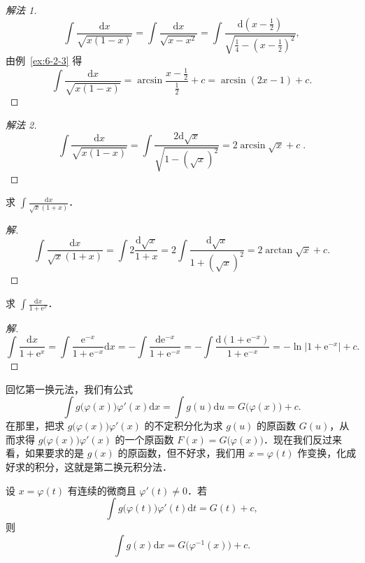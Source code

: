 \begin{proof}[解法 1]
\[
\int\frac{\mathrm{d}x}{\sqrt{x(1-x)}}
= \int\frac{\mathrm{d}x}{\sqrt{x-x^{2}}}
= \int\frac{\mathrm{d}\left(x-\frac{1}{2}\right)}{\sqrt{\frac{1}{4}-\left(x-\frac{1}{2}\right)^{2}}},
\]
由例~\ref{ex:6-2-3} 得
\[
\int\frac{\mathrm{d}x}{\sqrt{x(1-x)}}
= \arcsin\frac{x-\frac{1}{2}}{\frac{1}{2}}+c
= \arcsin(2x-1)+c.
\]
\end{proof}

\begin{proof}[解法 2]
\[
\int\frac{\mathrm{d}x}{\sqrt{x(1-x)}}
= \int\frac{2\mathrm{d}\sqrt{x}}{\sqrt{1-(\sqrt{x})^{2}}}
= 2\arcsin\sqrt{x}+c\;.
\]
\end{proof}

\begin{example}\label{ex:6-2-6}
求 $\displaystyle\int\frac{\mathrm{d}x}{\sqrt{x}(1+x)}$．
\end{example}

\begin{proof}[解]
\[
\int\frac{\mathrm{d}x}{\sqrt{x}(1+x)}
= \int 2\frac{\mathrm{d}\sqrt{x}}{1+x}
= 2\int\frac{\mathrm{d}\sqrt{x}}{1+(\sqrt{x})^{2}}
= 2\arctan\sqrt{x}+c.
\]
\end{proof}

\begin{example}\label{ex:6-2-7}
求 $\displaystyle\int\frac{\mathrm{d}x}{1+\mathrm{e}^{x}}$．
\end{example}

\begin{proof}[解]
\[
\int\frac{\mathrm{d}x}{1+\mathrm{e}^{x}}
= \int\frac{\mathrm{e}^{-x}}{1+\mathrm{e}^{-x}}\mathrm{d}x
= -\int\frac{\mathrm{d}\mathrm{e}^{-x}}{1+\mathrm{e}^{-x}}
= -\int\frac{\mathrm{d}(1+\mathrm{e}^{-x})}{1+\mathrm{e}^{-x}}
= -\ln\left|1+\mathrm{e}^{-x}\right|+c.
\]
\end{proof}

回忆第一换元法，我们有公式
\[
\int g\big(\varphi(x)\big)\varphi'(x)\mathrm{d}x = \int g(u)\mathrm{d}u = G\big(\varphi(x)\big)+c.
\]
在那里，把求 $g\big(\varphi(x)\big)\varphi'(x)$ 的不定积分化为求 $g(u)$ 的原函数 $G(u)$，从而求得 $g\big(\varphi(x)\big)\varphi'(x)$ 的一个原函数 $F(x)=G\big(\varphi(x)\big)$．现在我们反过来看，如果要求的是 $g(x)$ 的原函数，但不好求，我们用 $x=\varphi(t)$ 作变换，化成好求的积分，这就是第二换元积分法．

\begin{theorem}[第二换元法]\label{thm:6-4}
设 $x = \varphi(t)$ 有连续的微商且 $\varphi'(t) \neq 0$．若
\begin{equation}
\int g\big(\varphi(t)\big)\varphi'(t)\mathrm{d}t = G(t) + c,\tag*{(3)}
\end{equation}
则
\begin{equation}
\int g(x)\mathrm{d}x = G\big(\varphi^{-1}(x)\big) + c.\tag*{(4)}
\end{equation}
\end{theorem}

